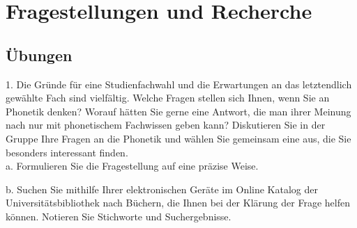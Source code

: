 \chapter{Fragestellungen und Recherche}

\section{Übungen}

1.	Die Gründe für eine Studienfachwahl und die Erwartungen an das letztendlich gewählte Fach sind vielfältig.  Welche Fragen stellen sich Ihnen, wenn Sie an Phonetik denken? Worauf hätten Sie gerne eine Antwort, die man ihrer Meinung nach nur mit phonetischem Fachwissen geben kann? Diskutieren Sie in der Gruppe Ihre Fragen an die Phonetik und wählen Sie gemeinsam eine aus, die Sie besonders interessant finden.\\
\newpage
a.	Formulieren Sie die Fragestellung auf eine präzise Weise.

\vspace*{5cm}


b.	Suchen Sie mithilfe Ihrer elektronischen Geräte im Online Katalog der Universitätsbibliothek nach Büchern, die Ihnen bei der Klärung der Frage helfen können. Notieren Sie Stichworte und Suchergebnisse.
\vspace*{5cm}
